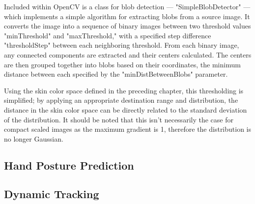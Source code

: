 Included within OpenCV is a class for blob detection --- "SimpleBlobDetector" --- which implements a simple algorithm for extracting blobs from a source image. It converts the image into a sequence of binary images between two threshold values "minThreshold" and "maxThreshold," with a specified step difference "thresholdStep" between each neighboring threshold. From each binary image, any connected components are extracted and their centers calculated. The centers are then grouped together into blobs based on their coordinates, the minimum distance between each specified by the "minDistBetweenBlobs" parameter.

Using the skin color space defined in the preceding chapter, this thresholding is simplified; by applying an appropriate destination range and distribution, the distance in the skin color space can be directly related to the standard deviation of the distribution. It should be noted that this isn't necessarily the case for compact scaled images as the maximum gradient is 1, therefore the distribution is no longer Gaussian.

\subsection{Hand Posture Prediction}\label{sec:HandPosturePrediction}
\subsection{Dynamic Tracking}\label{sec:DynamicTracking}
